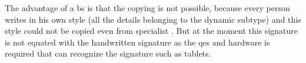 The advantage of a \gls{bs} is that the copying is not possible, because every person writes in his own style (all the details belonging to the dynamic subtype) and this style could not be copied even from specialist \parencite{Schmitz2004}. But at the moment this signature is not equated with the handwritten signature as the \gls{qes} and hardware is required that can recognize the signature such as tablets.

